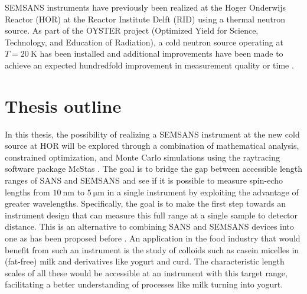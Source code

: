 SEMSANS instruments have previously been realized at the Hoger Onderwijs Reactor (HOR) at the Reactor Institute Delft (RID) using a thermal neutron source. As part of the OYSTER project (Optimized Yield for Science, Technology, and Education of Radiation), a cold neutron source operating at $T=\SI{20}{\kelvin}$ has been installed and additional improvements have been made to achieve an expected hundredfold improvement in measurement quality or time \cite{OYSTER2008}.

\section{Thesis outline}
\label{c1.3}
In this thesis, the possibility of realizing a SEMSANS instrument at the new cold source at HOR will be explored through a combination of mathematical analysis, constrained optimization, and Monte Carlo simulations using the raytracing software package McStas \cite{willendrup2020}. The goal is to bridge the gap between accessible length ranges of SANS and SEMSANS \cite{bouwman2021} and see if it is possible to measure spin-echo lengths from $\SI{10}{\nano\meter}$ to $\SI{5}{\micro\meter}$ in a single instrument by exploiting the advantage of greater wavelengths. Specifically, the goal is to make the first step towards an instrument design that can measure this full range at a single sample to detector distance. This is an alternative to combining SANS and SEMSANS devices into one as has been proposed before \cite{bouwman2011}\cite{kusmin2017}. An application in the food industry that would benefit from such an instrument is the study of colloids such as casein micelles in (fat-free) milk and derivatives like yogurt and curd. The characteristic length scales of all these would be accessible at an instrument with this target range, facilitating a better understanding of processes like milk turning into yogurt. 
